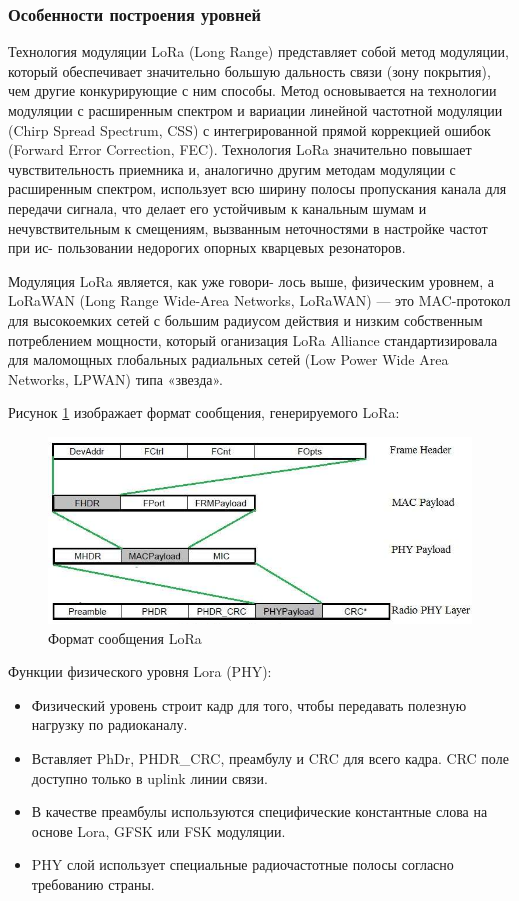 \subsubsection{Особенности построения уровней}
Технология модуляции LoRa (Long Range)
представляет собой метод модуляции, который обеспечивает значительно большую
дальность связи (зону покрытия), чем другие конкурирующие с ним способы. Метод
основывается на технологии модуляции с расширенным спектром и вариации линейной
частотной модуляции (Chirp Spread Spectrum,
CSS) с интегрированной прямой коррекцией ошибок (Forward Error Correction, FEC).
Технология LoRa значительно повышает
чувствительность приемника и, аналогично
другим методам модуляции с расширенным
спектром, использует всю ширину полосы
пропускания канала для передачи сигнала, что
делает его устойчивым к канальным шумам
и нечувствительным к смещениям, вызванным неточностями в настройке частот при ис-
пользовании недорогих опорных кварцевых
резонаторов.

Модуляция LoRa является, как уже говори-
лось выше, физическим уровнем, а LoRaWAN
(Long Range Wide-Area Networks, LoRaWAN) —
это MAC-протокол для высокоемких сетей
с большим радиусом действия и низким собственным потреблением мощности, который
оганизация LoRa Alliance стандартизировала
для маломощных глобальных радиальных сетей (Low Power Wide Area Networks, LPWAN)
типа «звезда».

Рисунок \ref{fig:lora-phy} изображает формат сообщения, генерируемого LoRa:

\begin{figure}[H]
	\centering\includegraphics[width=1\linewidth]{img/lora-phy}
	\caption{Формат сообщения LoRa}
	\label{fig:lora-phy}
\end{figure}

Функции физического уровня Lora (PHY):
\begin{itemize}
\item Физический уровень строит кадр для того, чтобы передавать полезную нагрузку по радиоканалу.
\item Вставляет PhDr, PHDR\_CRC, преамбулу и CRC для всего кадра. CRC поле доступно только в uplink линии связи.
\item В качестве преамбулы используются специфические константные слова на основе Lora, GFSK или FSK модуляции.
\item PHY слой использует специальные радиочастотные полосы согласно требованию страны.
\end{itemize}

